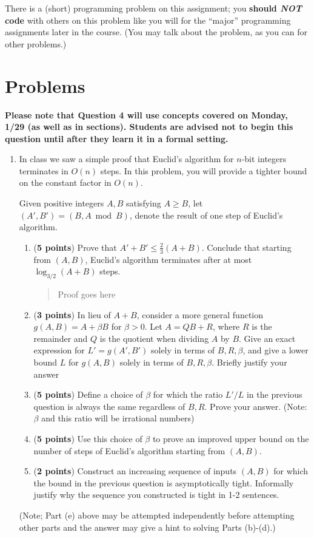 \documentclass[11pt]{article}
\begin{document}
There is a (short) programming problem on this assignment; you {\bf should \textit{NOT} code} with others on
this problem like you will for the ``major'' programming assignments later in the course. (You may
talk about the problem, as you can for other problems.)


\section*{Problems}

\textbf{Please note that Question 4 will use concepts covered on Monday, 1/29 (as well as in sections). Students are advised not to begin this question until after they learn it in a formal setting.}

\begin{enumerate}[leftmargin=*]


\item In class we saw a simple proof that Euclid's algorithm for $n$-bit integers terminates in $O(n)$ steps. In this problem, you will provide a tighter bound on the constant factor in $O(n)$.

Given positive integers $A, B$ satisfying $A \ge B$, let $(A',B') = (B,A \bmod B)$, denote the result of one step of Euclid's algorithm.

\begin{enumerate}
    \item (\textbf{5 points}) Prove that $A' + B' \le \frac{2}{3}(A + B)$. Conclude that starting from $(A,B)$, Euclid's algorithm terminates after at most $\log_{3/2}(A+B)$ steps.
      \begin{quote}
        \color{purple}
        Proof goes here
      \end{quote}
    \item (\textbf{3 points}) In lieu of $A+B$, consider a more general function $g(A,B) = A + \beta B$ for $\beta > 0$. Let $A = QB+R$, where $R$ is the remainder and $Q$ is the quotient when dividing $A$ by $B$. Give an exact expression for $L' = g(A',B')$ solely in terms of $B,R,\beta$, and give a lower bound $L$ for $g(A,B)$ solely in terms of $B, R, \beta$. Briefly justify your answer
    \item (\textbf{5 points}) Define a choice of $\beta$ for which the ratio $L'/L$ in the previous question is always the same regardless of $B,R$. Prove your answer. (Note: $\beta$ and this ratio will be irrational numbers)
    \item (\textbf{5 points}) Use this choice of $\beta$ to prove an improved upper bound on the number of steps of Euclid's algorithm starting from $(A,B)$.
    \item (\textbf{2 points}) Construct an increasing sequence of inputs $(A,B)$ for which the bound in the previous question is asymptotically tight. Informally justify why the sequence you constructed is tight in 1-2 sentences.
\end{enumerate}
(Note; Part (e) above may be attempted independently before attempting other parts and the answer may give a hint to solving Parts (b)-(d).)



\end{enumerate}
\end{document}
